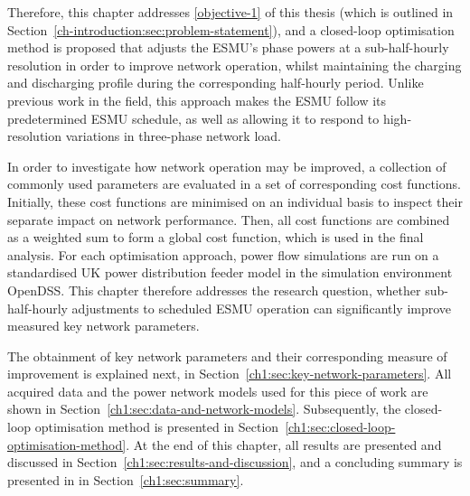 Therefore, this chapter addresses \ref{objective-1} of this thesis (which is outlined in Section~\ref{ch-introduction:sec:problem-statement}), and a closed-loop optimisation method is proposed that adjusts the ESMU's phase powers at a sub-half-hourly resolution in order to improve network operation, whilst maintaining the charging and discharging profile during the corresponding half-hourly period.
Unlike previous work in the field, this approach makes the ESMU follow its  predetermined ESMU schedule, as well as allowing it to respond to high-resolution variations in three-phase network load.

In order to investigate how network operation may be improved, a collection of commonly used parameters are evaluated in a set of corresponding cost functions.
Initially, these cost functions are minimised on an individual basis to inspect their separate impact on network performance.
Then, all cost functions are combined as a weighted sum to form a global cost function, which is used in the final analysis.
For each optimisation approach, power flow simulations are run on a standardised UK power distribution feeder model in the simulation environment OpenDSS.
This chapter therefore addresses the research question, whether sub-half-hourly adjustments to scheduled ESMU operation can significantly improve measured key network parameters.

The obtainment of key network parameters and their corresponding measure of improvement is explained next, in Section~\ref{ch1:sec:key-network-parameters}.
All acquired data and the power network models used for this piece of work are shown in Section~\ref{ch1:sec:data-and-network-models}.
Subsequently, the closed-loop optimisation method is presented in Section~\ref{ch1:sec:closed-loop-optimisation-method}.
At the end of this chapter, all results are presented and discussed in Section~\ref{ch1:sec:results-and-discussion}, and a concluding summary is presented in in Section~\ref{ch1:sec:summary}.
